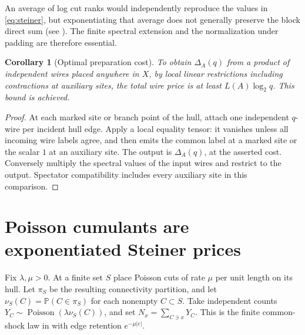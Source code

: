 \documentclass[11pt]{article}
\newtheorem{corollary}[theorem]{Corollary}
\theoremstyle{remark}
\newcommand{\Prob}{\mathbb P}
\newcommand{\D}{\Delta}
\begin{document}
An average of log cut ranks would independently reproduce the values in \eqref{eq:steiner}, but exponentiating that average does not generally preserve the block direct sum (see \cite[Section~1.1]{OpenAI}). The finite spectral extension and the normalization under padding are therefore essential.

\begin{corollary}[Optimal preparation cost]\label{cor:optimal}
To obtain \(\D_A(q)\) from a product of independent wires placed anywhere in \(X\), by local linear restrictions including contractions at auxiliary sites, the total wire price is at least \(L(A)\log_2q\). This bound is achieved.
\end{corollary}
\begin{proof}
At each marked site or branch point of the hull, attach one independent \(q\)-wire per incident hull edge. Apply a local equality tensor: it vanishes unless all incoming wire labels agree, and then emits the common label at a marked site or the scalar \(1\) at an auxiliary site. The output is \(\D_A(q)\), at the asserted cost. Conversely multiply the spectral values of the input wires and restrict to the output. Spectator compatibility includes every auxiliary site in this comparison.
\end{proof}

\section{Poisson cumulants are exponentiated Steiner prices}

Fix \(\lambda,\mu>0\). At a finite set \(S\) place Poisson cuts of rate \(\mu\) per unit length on its hull. Let \(\pi_S\) be the resulting connectivity partition, and let \(\nu_S(C)=\Prob(C\in\pi_S)\) for each nonempty \(C\subset S\). Take independent counts \(Y_C\sim\operatorname{Poisson}(\lambda\nu_S(C))\), and set \(N_x=\sum_{C\ni x}Y_C\). This is the finite common-shock law in \cite{Cossette} with edge retention \(e^{-\mu|e|}\).
\end{document}
